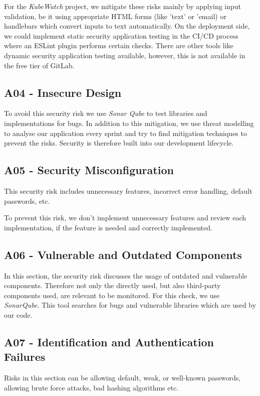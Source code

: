 For the \textit{KubeWatch} project, we mitigate these risks mainly by applying input validation, be it using appropriate HTML forms (like 'text' or 'email) or handlebars which convert inputs to text automatically. On the deployment side, we could implement static security application testing in the CI/CD process where an ESLint plugin performs certain checks. There are other tools like dynamic security application testing available, however, this is not available in the free tier of GitLab.

\subsection{A04 - Insecure Design}
To avoid this security risk we use \textit{Sonar Qube} to test libraries and implementations for bugs. In addition to this mitigation, we use threat modelling to analyse our application every sprint and try to find mitigation techniques to prevent the risks. Security is therefore built into our development lifecycle.

\subsection{A05 - Security Misconfiguration}
This security risk includes unnecessary features, incorrect error handling, default passwords, etc.

To prevent this risk, we don't implement unnecessary features and review each implementation, if the feature is needed and correctly implemented.

\subsection{A06 - Vulnerable and Outdated Components}
In this section, the security risk discusses the usage of outdated and vulnerable components. Therefore not only the directly used, but also third-party components used, are relevant to be monitored. For this check, we use \textit{SonarQube}. This tool searches for bugs and vulnerable libraries which are used by our code.

\subsection{A07 - Identification and Authentication Failures}
Risks in this section can be allowing default, weak, or well-known passwords, allowing brute force attacks, bad hashing algorithms etc.

